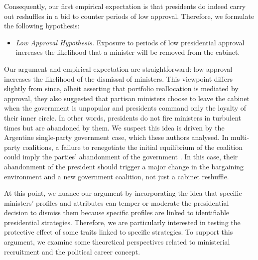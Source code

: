 \documentclass[12pt,halfline,a4paper]{ouparticle}
\begin{document}
Consequently, our first empirical expectation is that presidents do indeed carry out reshuffles in a bid to counter periods of low approval. Therefore, we formulate the following hypothesis:

\begin{itemize}
\item{{\itshape Low Approval Hypothesis.} Exposure to periods of low presidential approval increases the likelihood that a minister will be removed from the cabinet.}
\end{itemize}

Our argument and empirical expectation are straightforward: low approval increases the likelihood of the dismissal of ministers. This viewpoint differs slightly from \cite{Camerlo2015b} since, albeit asserting that portfolio reallocation is mediated by approval, they also suggested that partisan ministers choose to leave the cabinet when the government is unpopular and presidents command only the loyalty of their inner circle. In other words, presidents do not fire ministers in turbulent times but are abandoned by them. We suspect this idea is driven by the Argentine single-party government case, which these authors analysed. In multi-party coalitions, a failure to renegotiate the initial equilibrium of the coalition could imply the parties’ abandonment of the government \citep{MartinezGallardo2012}. In this case, their abandonment of the president should trigger a major change in the bargaining environment and a new government coalition, not just a cabinet reshuffle.

At this point, we nuance our argument by incorporating the idea that specific ministers’ profiles and attributes can temper or moderate the presidential decision to dismiss them because specific profiles are linked to identifiable presidential strategies. Therefore, we are particularly interested in testing the protective effect of some traits linked to specific strategies. To support this argument, we examine some theoretical perspectives related to ministerial recruitment and the political career concept. 
\end{document}
